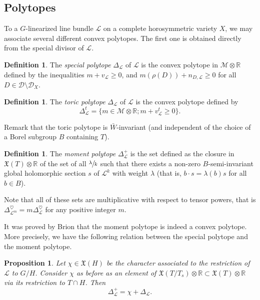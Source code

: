 \documentclass{amsart}
\newtheorem{prop}[thm]{Proposition}
\theoremstyle{definition}
\newtheorem{defn}[thm]{Definition}
\begin{document}
\subsection{Polytopes}

To a $G$-linearized line bundle $\mathcal{L}$ on a complete horosymmetric variety $X$, 
we may associate several different convex 
polytopes. The first one is obtained directly from the special divisor of $\mathcal{L}$. 

\begin{defn}
The \emph{special polytope} $\Delta_{\mathcal{L}}$ of $\mathcal{L}$ is the convex polytope 
in $\mathcal{M}\otimes \mathbb{R}$ defined by the inequalities 
$m+v_{\mathcal{L}}\geq 0$, and  
$m(\rho(D))+n_{D,\mathcal{L}}\geq 0$ for all $D\in \mathcal{D}\setminus \mathcal{D}_X$.
\end{defn}

\begin{defn}
The \emph{toric polytope} $\Delta_{\mathcal{L}}$ of $\mathcal{L}$ is the convex polytope 
defined by 
\[
\Delta^t_{\mathcal{L}}=\{m\in \mathcal{M}\otimes \mathbb{R} ; 
m+v^t_{\mathcal{L}}\geq 0 \}.
\]
\end{defn}

Remark that the toric polytope is $\bar{W}$-invariant (and independent of the choice of a 
Borel subgroup $B$ containing $T$).

\begin{defn}
The \emph{moment polytope} $\Delta^+_{\mathcal{L}}$ is the set defined as the closure 
in $\mathfrak{X}(T)\otimes \mathbb{R}$ of the set of all 
$\sfrac{\lambda}{k}$ such that there exists a non-zero $B$-semi-invariant 
global holomorphic section $s$ of $\mathcal{L}^k$ with weight $\lambda$ 
(that is, $b\cdot s=\lambda(b)s$ for all $b\in B$).
\end{defn}

Note that all of these sets are multiplicative with respect to tensor powers, 
that is $\Delta^{\heartsuit}_{\mathcal{L}^m}=m\Delta^{\heartsuit}_{\mathcal{L}}$
for any positive integer $m$.

It was proved by Brion that the moment polytope is indeed a convex polytope. 
More precisely, we have the following relation between the special 
polytope and the moment polytope. 

\begin{prop}
\label{prop_moment_vs_special}
Let $\chi\in \mathfrak{X}(H)$ be the character associated to the restriction of 
$\mathcal{L}$ to $G/H$. Consider $\chi$ as before as an element of 
$\mathfrak{X}(T/T_s)\otimes \mathbb{R} \subset \mathfrak{X}(T)\otimes \mathbb{R}$
via its restriction to $T\cap H$.
Then 
\[
\Delta^+_{\mathcal{L}}=\chi + \Delta_{\mathcal{L}}. 
\]
\end{prop}
\end{document}
